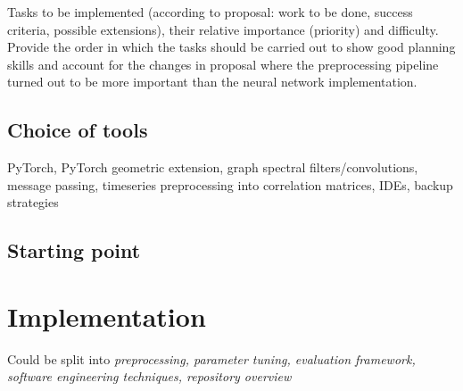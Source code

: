 \documentclass[12pt,a4paper,twoside, openright, hidelinks]{report}
\begin{document}
Tasks to be implemented (according to proposal: work to be done, success criteria, possible extensions), their relative importance (priority) and difficulty. Provide the order in which the tasks should be carried out to show good planning skills and account for the changes in proposal where the preprocessing pipeline turned out to be more important than the neural network implementation.

\section{Choice of tools}
PyTorch, PyTorch geometric extension, graph spectral filters/convolutions, message passing, timeseries preprocessing into correlation matrices, IDEs, backup strategies

\section{Starting point}


\chapter{Implementation}

Could be split into \textit{preprocessing, parameter tuning, evaluation framework, software engineering techniques, repository overview}
\end{document}
